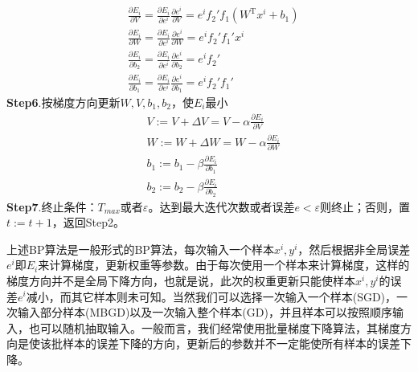             \begin{align*}
            & \frac{\partial E_i}{\partial V} = \frac{\partial E_i}{\partial e^i}\frac{\partial e^i}{\partial V} = e^i f_2' f_1 (W^\mathrm{T}x^i+b_1) \\
            & \frac{\partial E_i}{\partial W }= \frac{\partial E_i}{\partial e^i}\frac{\partial e^i}{\partial W} = e^i f_2'f_1'x^i    \\
            & \frac{\partial E_i}{\partial b_2} = \frac{\partial E_i}{\partial e^i}\frac{\partial e^i}{\partial b_2} = e^i f_2' \\
            & \frac{\partial E_i}{\partial b_1} = \frac{\partial E_i}{\partial e^i}\frac{\partial e^i}{\partial b_1} = e^if_2'f_1'
            \end{align*}
            \textbf{Step6}.按梯度方向更新$W,V,b_1,b_2$，使$E_i$最小
            \begin{align*}
            & V :=V+\Delta V = V -\alpha \frac{\partial E_i}{\partial V}\\
            & W:=W + \Delta W = W - \alpha \frac{\partial E_i}{\partial W}\\
            & b_1:=b_1 -\beta \frac{\partial E_i}{\partial b_1}\\
            & b_2:=b_2 - \beta \frac{\partial E_i}{\partial b_2}
            \end{align*}
            \textbf{Step7}.终止条件：$T_{max}$或者$\varepsilon$。达到最大迭代次数或者误差$e<\varepsilon$则终止；否则，置$t:=t+1$，返回Step2。
            \par
            上述BP算法是一般形式的BP算法，每次输入一个样本$x^i,y^i$，然后根据非全局误差$e^i$即$E_i$来计算梯度，更新权重等参数。由于每次使用一个样本来计算梯度，这样的梯度方向并不是全局下降方向，也就是说，此次的权重更新只能使样本$x^i,y^i$的误差$e^i$减小，而其它样本则未可知。当然我们可以选择一次输入一个样本(SGD)，一次输入部分样本(MBGD)以及一次输入整个样本(GD)，并且样本可以按照顺序输入，也可以随机抽取输入。一般而言，我们经常使用批量梯度下降算法，其梯度方向是使该批样本的误差下降的方向，更新后的参数并不一定能使所有样本的误差下降。
